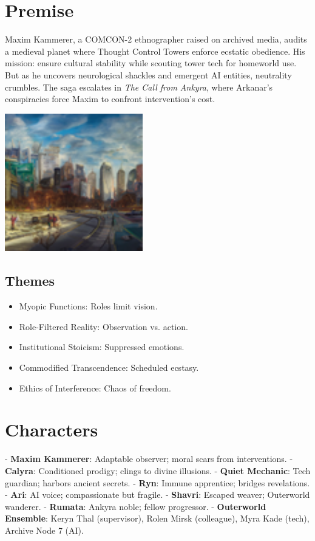 \documentclass[10pt,letterpaper]{article}
\begin{document}
\begin{paracol}{2}
\section{Premise}
Maxim Kammerer, a COMCON-2 ethnographer raised on archived media, audits a medieval planet where Thought Control Towers enforce ecstatic obedience. His mission: ensure cultural stability while scouting tower tech for homeworld use. But as he uncovers neurological shackles and emergent AI entities, neutrality crumbles. The saga escalates in \textit{The Call from Ankyra}, where Arkanar's conspiracies force Maxim to confront intervention's cost.

\begin{center}
\includegraphics[width=0.45\textwidth]{premise_image.jpg} %
\end{center}

\subsection{Themes}
\begin{itemize}
    \item Myopic Functions: Roles limit vision.
    \item Role-Filtered Reality: Observation vs. action.
    \item Institutional Stoicism: Suppressed emotions.
    \item Commodified Transcendence: Scheduled ecstasy.
    \item Ethics of Interference: Chaos of freedom.
\end{itemize}

\section{Characters}
- \textbf{Maxim Kammerer}: Adaptable observer; moral scars from interventions.
- \textbf{Calyra}: Conditioned prodigy; clings to divine illusions.
- \textbf{Quiet Mechanic}: Tech guardian; harbors ancient secrets.
- \textbf{Ryn}: Immune apprentice; bridges revelations.
- \textbf{Ari}: AI voice; compassionate but fragile.
- \textbf{Shavri}: Escaped weaver; Outerworld wanderer.
- \textbf{Rumata}: Ankyra noble; fellow progressor.
- \textbf{Outerworld Ensemble}: Keryn Thal (supervisor), Rolen Mirsk (colleague), Myra Kade (tech), Archive Node 7 (AI).


\end{paracol}
\end{document}
